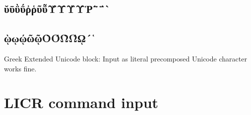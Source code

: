 \documentclass{article}
\begin{document}
\subsection{ῠῡῢΰῤῥῦῧῨῩῪΎῬ῭΅`}
\subsection{ῲῳῴῶῷῸΌῺΏῼ´῾}

Greek Extended Unicode block: Input as literal precomposed Unicode character
works fine.

\section{LICR command input}

\subsection{}
\subsection{\ensuregreek{
  \textXi
  \textOmicron
  \textPi
  \textRho
  \textSigma
  \textTau
  \textUpsilon
  \textPhi
  \textChi
  \textPsi
  \textOmega
  \"\textIota
  \"\textUpsilon
}}

\subsection{}
\subsection{\ensuregreek{
  \textxi
  \textomicron
  \textpi
  \textrho
  \textvarsigma
  \textsigma
  \texttau
  \textupsilon
  \textphi
  \textchi
  \textpsi
  \textomega
  \"\textiota
  \"\textupsilon
  \'\textomicron
  \'\textupsilon
  \'\textomega
  \textbetasymbol
  \textthetasymbol
  \textphisymbol
  \textpisymbol
  \textQoppa
  \textqoppa
  \textStigma
  \textstigma
  \textDigamma
  \textdigamma
  \textKoppa
  \textkoppa
  \textSampi
  \textsampi
}}
\end{document}
